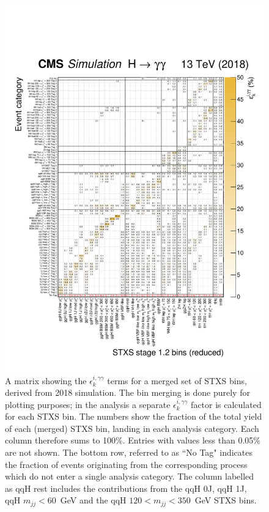 \begin{figure}[hptb]
  \centering
  \includegraphics[width=1\textwidth]{Figures/app_matrices/migrationMatrix_2018_thesis.pdf}
  \caption[Efficiency times acceptance matrix from 2018 simulation]
  {
    A matrix showing the $\epsilon^{i,\gamma\gamma}_{k}$ terms for a merged set of STXS bins, derived from 2018 simulation. The bin merging is done purely for plotting purposes; in the analysis a separate $\epsilon^{i,\gamma\gamma}_{k}$ factor is calculated for each STXS bin. The numbers show the fraction of the total yield of each (merged) STXS bin, landing in each analysis category. Each column therefore sums to 100\%. Entries with values less than 0.05\% are not shown. The bottom row, referred to as ``No Tag" indicates the fraction of events originating from the corresponding process which do not enter a single analysis category. The column labelled as qqH rest includes the contributions from the qqH 0J, qqH 1J, qqH $m_{jj}<60$~GeV and the qqH $120<m_{jj}<350$~GeV STXS bins.
  }
  \label{fig:ea_2017}
\end{figure}